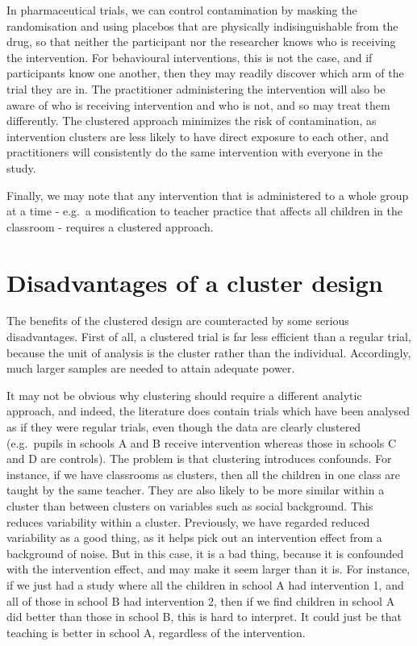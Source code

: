 \documentclass{krantz}
\begin{document}
In pharmaceutical trials, we can control contamination by masking the randomisation and using placebos that are physically indisinguishable from the drug, so that neither the participant nor the researcher knows who is receiving the intervention. For behavioural interventions, this is not the case, and if participants know one another, then they may readily discover which arm of the trial they are in. The practitioner administering the intervention will also be aware of who is receiving intervention and who is not, and so may treat them differently. The clustered approach minimizes the risk of contamination, as intervention clusters are less likely to have direct exposure to each other, and practitioners will consistently do the same intervention with everyone in the study.

Finally, we may note that any intervention that is administered to a whole group at a time - e.g.~a modification to teacher practice that affects all children in the classroom - requires a clustered approach.

\hypertarget{disadvantages-of-a-cluster-design}{%
\section{Disadvantages of a cluster design}\label{disadvantages-of-a-cluster-design}}

The benefits of the clustered design are counteracted by some serious disadvantages. First of all, a clustered trial is far less efficient than a regular trial, because the unit of analysis is the cluster rather than the individual. Accordingly, much larger samples are needed to attain adequate power.

It may not be obvious why clustering should require a different analytic approach, and indeed, the literature does contain trials which have been analysed as if they were regular trials, even though the data are clearly clustered (e.g.~pupils in schools A and B receive intervention whereas those in schools C and D are controls). The problem is that clustering introduces confounds. For instance, if we have classrooms as clusters, then all the children in one class are taught by the same teacher. They are also likely to be more similar within a cluster than between clusters on variables such as social background. This reduces variability within a cluster. Previously, we have regarded reduced variability as a good thing, as it helps pick out an intervention effect from a background of noise. But in this case, it is a bad thing, because it is confounded with the intervention effect, and may make it seem larger than it is. For instance, if we just had a study where all the children in school A had intervention 1, and all of those in school B had intervention 2, then if we find children in school A did better than those in school B, this is hard to interpret. It could just be that teaching is better in school A, regardless of the intervention.
\end{document}

